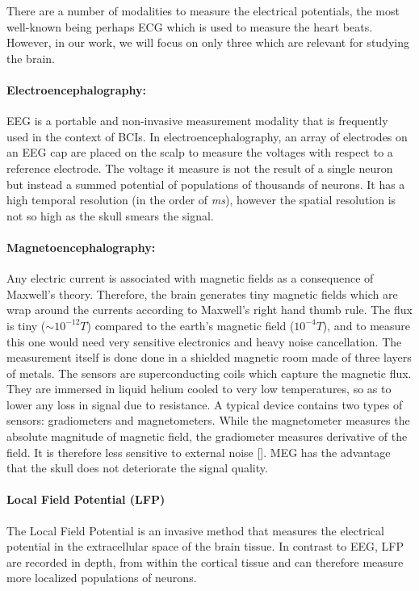 There are a number of modalities to measure the electrical potentials, the most well-known being perhaps \ac{ECG} which is used to measure the heart beats. However, in our work, we will focus on only three which are relevant for studying the brain.

\paragraph{Electroencephalography: } \Ac{EEG} is a portable and non-invasive measurement modality that is frequently used in the context of \acp{BCI}. In electroencephalography, an array of electrodes on an \ac{EEG} cap are placed on the scalp to measure the voltages with respect to a reference electrode. The voltage it measure is not the result of a single neuron but instead a summed potential of populations of thousands of neurons. It has a high temporal resolution (in the order of \emph{ms}), however the spatial resolution is not so high as the skull smears the signal.

\paragraph{Magnetoencephalography: } Any electric current is associated with magnetic fields as a consequence of Maxwell's theory. Therefore, the brain generates tiny magnetic fields which are wrap around the currents according to Maxwell's right hand thumb rule. The flux is tiny ($\sim10^{-12}T$) compared to the earth's magnetic field ($10^{-4}T$), and to measure this one would need very sensitive electronics and heavy noise cancellation. The measurement itself is done done in a shielded magnetic room made of three layers of metals. The sensors are superconducting coils which capture the magnetic flux. They are immersed in liquid helium cooled to very low temperatures, so as to lower any loss in signal due to resistance. A typical device contains two types of sensors: gradiometers and magnetometers. While the magnetometer measures the absolute magnitude of magnetic field, the gradiometer measures derivative of the field. It is therefore less sensitive to external noise []. \ac{MEG} has the advantage that the skull does not deteriorate the signal quality.

\paragraph{Local Field Potential (LFP)}
The Local Field Potential is an invasive method that measures the electrical potential in the extracellular space of the brain tissue. In contrast to \ac{EEG}, LFP are recorded in depth, from within the cortical tissue and can therefore measure more localized populations of neurons.

